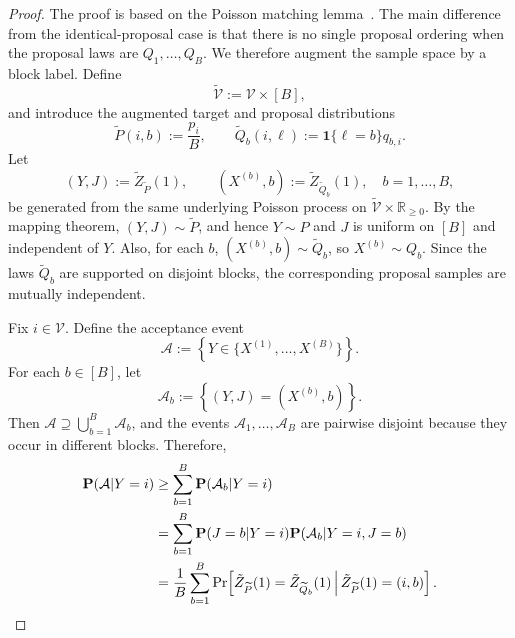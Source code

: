 \documentclass{article}
\theoremstyle{plain}
\theoremstyle{definition}
\begin{document}
\begin{proof}
The proof is based on the Poisson matching lemma~\citep{li2021unified}. 
The main difference from the identical-proposal case is that there is no single
proposal ordering when the proposal laws are $Q_1,\ldots,Q_B$. We therefore
augment the sample space by a block label. Define
\[
    \widetilde{\mathcal V}:=\mathcal V\times[B],
\]
and introduce the augmented target and proposal distributions
\[
    \widetilde P(i,b):=\frac{p_i}{B},
    \qquad
    \widetilde Q_b(i,\ell):=\mathbf 1\{\ell=b\}q_{b,i}.
\]
Let
\[
    (Y,J):=\tilde Z_{\widetilde P}(1),
    \qquad
    (X^{(b)},b):=\tilde Z_{\widetilde Q_b}(1),
    \quad b=1,\ldots,B,
\]
be generated from the same underlying Poisson process on
$\widetilde{\mathcal V}\times\mathbb R_{\ge 0}$. By the mapping theorem,
$(Y,J)\sim\widetilde P$, and hence $Y\sim P$ and $J$ is uniform on $[B]$ and
independent of $Y$. Also, for each $b$, $(X^{(b)},b)\sim\widetilde Q_b$, so
$X^{(b)}\sim Q_b$. Since the laws $\widetilde Q_b$ are supported on disjoint
blocks, the corresponding proposal samples are mutually independent.

Fix $i\in\mathcal V$. Define the acceptance event
\[
    \mathcal A
    :=
    \left\{
        Y\in\{X^{(1)},\ldots,X^{(B)}\}
    \right\}.
\]
For each $b\in[B]$, let
\[
    \mathcal A_b
    :=
    \left\{
        (Y,J)=(X^{(b)},b)
    \right\}.
\]
Then $\mathcal A\supseteq \bigcup_{b=1}^B\mathcal A_b$, and the events
$\mathcal A_1,\ldots,\mathcal A_B$ are pairwise disjoint because they occur in
different blocks. Therefore,
\begin{align}
    \mathbf{P}(\mathcal A| Y=i)
    &\ge
    \sum_{b=1}^B
    \mathbf{P}(\mathcal A_b| Y=i) \notag\\
    &=
    \sum_{b=1}^B
    \mathbf{P}(J=b| Y=i)
    \mathbf{P}(\mathcal A_b| Y=i,J=b) \notag\\
    &=
    \frac{1}{B}
    \sum_{b=1}^B
    \Pr\!\left[
        \tilde Z_{\widetilde P}(1)=\tilde Z_{\widetilde Q_b}(1)
        \,\middle|\,
        \tilde Z_{\widetilde P}(1)=(i,b)
    \right].
\label{eq::heterogeneous_reduction}
\end{align}


\end{proof}
\end{document}
